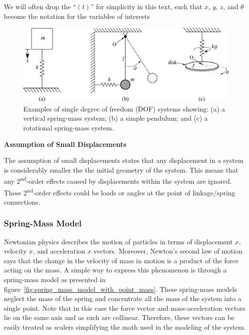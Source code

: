 \documentclass[12pt,letter]{article}
\begin{document}
		\pagebreak
		\begin{note}
			We will often drop the ``$(t)$'' for simplicity in this text, such that $x$,  $y$,  $z$, and  $\theta$ become the notation for the variables of interests
		\end{note}

		\begin{figure}[H]
			\centering
			\includegraphics[]{../figures/Examples_of_1DOF_systems.png}
			\caption{Examples of single degree of freedom (DOF) systems showing: (a) a vertical spring-mass system; (b) a simple pendulum; and (c) a rotational spring-mass system.}
			\label{fig:Examples_of_1DOF_systems}
		\end{figure}

		\begin{review}
			
			\textbf{Assumption of Small Displacements}

		\noindent The assumption of small displacements states that any displacement in a system is considerably smaller the the initial geometry of the system. This means that any 2\textsuperscript{nd}-order effects caused by displacements within the system are ignored. These 2\textsuperscript{nd}-order effects could be loads or angles at the point of linkage/spring connections. 
		\end{review}
	
		\subsubsection{Spring-Mass Model}


							
            Newtonian physics describes the motion of particles in terms of displacement $x$, velocity $\dot{x}$, and acceleration $\ddot{x}$ vectors. Moreover, Newton's second law of motion says that the change in the velocity of mass in motion is a product of the force acting on the mass. A simple way to express this phenomenon is through a spring-mass model as presented in figure~\ref{fig:spring_mass_model_with_point_mass}. These spring-mass models neglect the mass of the spring and concentrate all the mass of the system into a single point. Note that in this case the force vector and mass-acceleration vectors lie on the same axis and as such are collinear. Therefore, these vectors can be easily treated as scalers simplifying the math used in the modeling of the system.     
\end{document}
